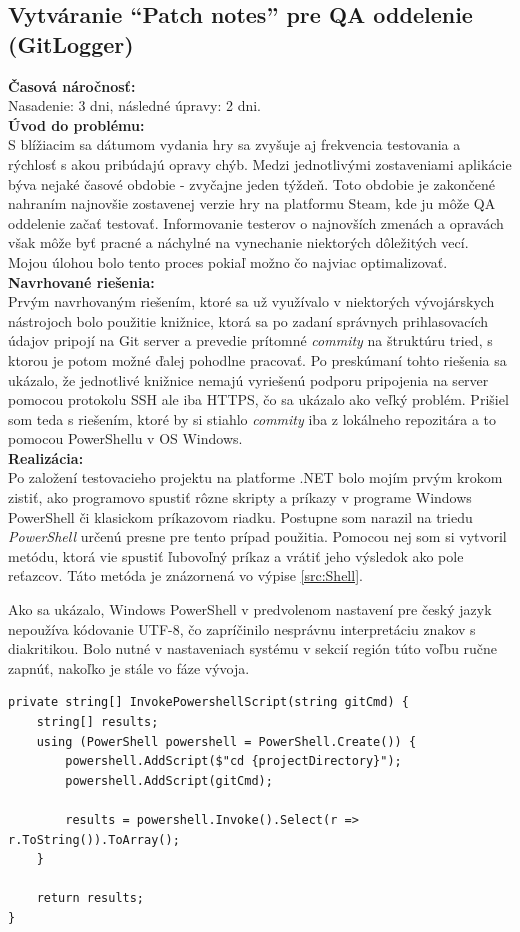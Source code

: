\documentclass[slovak, bachelorpractice]{diploma}
\begin{document}
\subsection{Vytváranie \enquote{Patch notes} pre QA oddelenie (GitLogger)}
\label{sec:GitLogger}
\textbf{Časová náročnosť:} \\ Nasadenie: 3 dni, následné úpravy: 2 dni.\\
\textbf{Úvod do problému:} \\ S blížiacim sa dátumom vydania hry sa zvyšuje aj frekvencia testovania a rýchlosť s akou pribúdajú opravy chýb. Medzi jednotlivými zostaveniami aplikácie býva nejaké časové obdobie - zvyčajne jeden týždeň. Toto obdobie je zakončené nahraním najnovšie zostavenej verzie hry na platformu Steam, kde ju môže QA oddelenie začať testovať. Informovanie testerov o najnovších zmenách a opravách však môže byť pracné a náchylné na vynechanie niektorých dôležitých vecí. Mojou úlohou bolo tento proces pokiaľ možno čo najviac optimalizovať.\\
\textbf{Navrhované riešenia:} \\ Prvým navrhovaným riešením, ktoré sa už využívalo v niektorých vývojárskych nástrojoch bolo použitie knižnice, ktorá sa po zadaní správnych prihlasovacích údajov pripojí na Git server a prevedie prítomné \textit{commity} na štruktúru tried, s ktorou je potom možné ďalej pohodlne pracovať. Po preskúmaní tohto riešenia sa ukázalo, že jednotlivé knižnice nemajú vyriešenú podporu pripojenia na server pomocou protokolu SSH ale iba HTTPS, čo sa ukázalo ako veľký problém. Prišiel som teda s riešením, ktoré by si stiahlo \textit{commity} iba z lokálneho repozitára a to pomocou PowerShellu v OS Windows.  \\
\textbf{Realizácia:} \\ Po založení testovacieho projektu na platforme .NET bolo mojím prvým krokom zistiť, ako programovo spustiť rôzne skripty a príkazy v programe Windows PowerShell či klasickom príkazovom riadku. Postupne som narazil na triedu \textit{PowerShell} určenú presne pre tento prípad použitia. Pomocou nej som si vytvoril metódu, ktorá vie spustiť ľubovoľný príkaz a vrátiť jeho výsledok ako pole reťazcov. Táto metóda je znázornená vo výpise \ref{src:Shell}. 

Ako sa ukázalo, Windows PowerShell v predvolenom nastavení pre český jazyk nepoužíva kódovanie UTF-8, čo zapríčinilo nesprávnu interpretáciu znakov s diakritikou. Bolo nutné v nastaveniach systému v sekcií región túto voľbu ručne zapnúť, nakoľko je stále vo fáze vývoja.
\vspace{10pt}
\begin{lstlisting}[label=src:Shell,caption={Metóda vykonávajúca skript v programe Powershell}]
private string[] InvokePowershellScript(string gitCmd) {
    string[] results;
    using (PowerShell powershell = PowerShell.Create()) {
        powershell.AddScript($"cd {projectDirectory}");
        powershell.AddScript(gitCmd);

        results = powershell.Invoke().Select(r => r.ToString()).ToArray();
    }

    return results;
}
\end{lstlisting}
\end{document}
